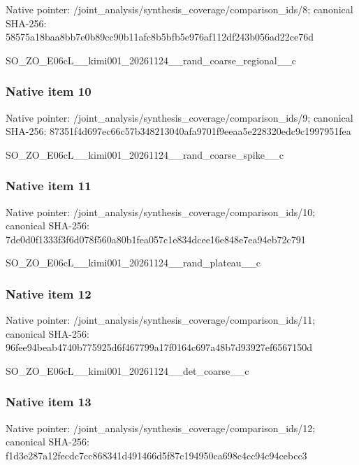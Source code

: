 \documentclass[10pt,a4paper]{article}
\begin{document}
Native pointer: /joint\_analysis/synthesi\allowbreak{}s\_coverage/comparison\_id\allowbreak{}s/8; canonical SHA-256: 58575a18baa8bb7e0b89cc90\allowbreak{}b11afc8b5bfb5e976af112df\allowbreak{}243b056ad22ce76d


SO\_ZO\_E06cL\_\_kimi001\_202\allowbreak{}61124\_\_rand\_coarse\_regio\allowbreak{}nal\_\_c


\subsubsection{Native item 10}


Native pointer: /joint\_analysis/synthesi\allowbreak{}s\_coverage/comparison\_id\allowbreak{}s/9; canonical SHA-256: 87351f4d697ec66c57b34821\allowbreak{}3040afa9701f9eeaa5e22832\allowbreak{}0edc9c1997951fea


SO\_ZO\_E06cL\_\_kimi001\_202\allowbreak{}61124\_\_rand\_coarse\_spike\allowbreak{}\_\_c


\subsubsection{Native item 11}


Native pointer: /joint\_analysis/synthesi\allowbreak{}s\_coverage/comparison\_id\allowbreak{}s/10; canonical SHA-256: 7de0d0f1333f3f6d078f560a\allowbreak{}80b1fea057c1e834dcee16e8\allowbreak{}48e7ea94eb72c791


SO\_ZO\_E06cL\_\_kimi001\_202\allowbreak{}61124\_\_rand\_plateau\_\_c


\subsubsection{Native item 12}


Native pointer: /joint\_analysis/synthesi\allowbreak{}s\_coverage/comparison\_id\allowbreak{}s/11; canonical SHA-256: 96fee94beab4740b775925d6\allowbreak{}f467799a17f0164c697a48b7\allowbreak{}d93927ef6567150d


SO\_ZO\_E06cL\_\_kimi001\_202\allowbreak{}61124\_\_det\_coarse\_\_c


\subsubsection{Native item 13}


Native pointer: /joint\_analysis/synthesi\allowbreak{}s\_coverage/comparison\_id\allowbreak{}s/12; canonical SHA-256: f1d3e287a12fecdc7cc86834\allowbreak{}1d491466d5f87c194950ca69\allowbreak{}8c4cc94c94cebcc3
\end{document}
